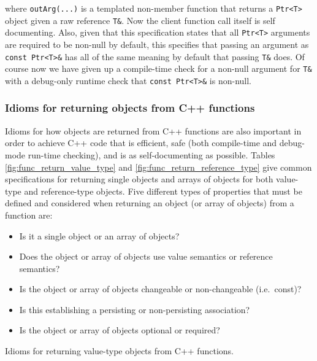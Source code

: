 \documentclass[pdf,ps2pdf,11pt]{SANDreport}
\begin{document}
where {}\texttt{outArg(...)} is a templated non-member function that
returns a {}\texttt{Ptr<T>} object given a raw reference
{}\texttt{T\&}.  Now the client function call itself is self
documenting.  Also, given that this specification states that all
{}\texttt{Ptr<T>} arguments are required to be non-null by default,
this specifies that passing an argument as {}\texttt{const Ptr<T>\&}
has all of the same meaning by default that passing {}\texttt{T\&}
does.  Of course now we have given up a compile-time check for a
non-null argument for {}\texttt{T\&} with a debug-only runtime check
that {}\texttt{const Ptr<T>\&} is non-null.


%
{}\subsubsection{Idioms for returning objects from C++ functions}
\label{sec:idioms-returning-objects}
%

Idioms for how objects are returned from C++ functions are also
important in order to achieve C++ code that is efficient, safe (both
compile-time and debug-mode run-time checking), and is as
self-documenting as possible.  Tables
{}\ref{fig:func_return_value_type} and
{}\ref{fig:func_return_reference_type} give common specifications for
returning single objects and arrays of objects for both value-type and
reference-type objects.  Five different types of properties that must
be defined and considered when returning an object (or array of
objects) from a function are:

\begin{itemize}

{}\item Is it a single object or an array of objects?

{}\item Does the object or array of objects use value semantics or
reference semantics?

{}\item Is the object or array of objects changeable or non-changeable
(i.e.\ const)?

{}\item Is this establishing a persisting or non-persisting
association?

{}\item Is the object or array of objects optional or required?

\end{itemize}


\begin{table}[p]
%
\begin{center}
%
%

%
%
%
\end{center}
\caption{\label{fig:func_return_value_type}
Idioms for returning value-type objects from C++ functions.}
%
\end{table}
\end{document}
